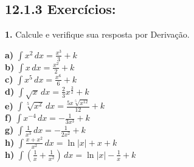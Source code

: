 \documentclass[article,12pt,oneside,a4paper,brazil]{abntex2}
\begin{document}
	\subsection*{12.1.3 Exercícios: }
	\begin{flushleft}	
		\textbf{1.} Calcule e verifique sua resposta por Derivação.
		
		\textbf{a) } $\int x^2 \,dx = \frac{x^3}{3} + k$ \\[1em]
		\textbf{b) } $\int x \,dx = \frac{x^2}{2} + k$ \\[1em]
		\textbf{c) } $\int x^5 \,dx = \frac{x^6}{6} + k$ \\[1em]
		\textbf{d) } $\int \sqrt{x} \,dx = \frac{2}{3} x^{\frac{3}{2}} + k$ \\[1em]
		\textbf{e) } $\int \sqrt[5]{x^2} \,dx = \frac{5 x \sqrt[5]{x^{12}}}{12} + k$ \\[1em]
		\textbf{f) } $\int x^{-4} \,dx = -\frac{1}{3 x^3} + k$ \\[1em]
		\textbf{g) } $\int \frac{1}{x^3} \,dx = -\frac{1}{2 x^2} + k$ \\[1em]
		\textbf{h) } $\int \frac{x + x^2}{x^2} \,dx = \ln{ \left| x \right| + x + k}$\\[1em]
		\textbf{h) } $\int \left( \frac{1}{x} + \frac{1}{x^2} \right) \,dx = \ln{\left| x \right|} - \frac{1}{x} + k$\\[1em]
		
		
	\end{flushleft}
	
	
	
	
\end{document}

